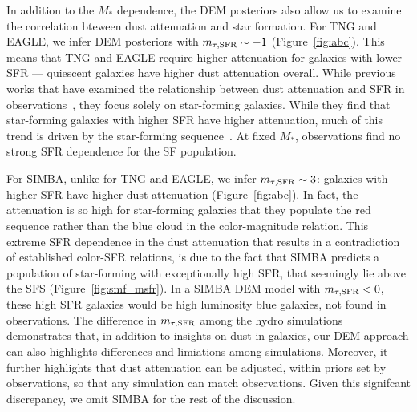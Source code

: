 In addition to the $M_*$ dependence, the DEM posteriors also allow us to
examine the correlation bteween dust attenuation and star formation. For TNG
and EAGLE, we infer DEM posteriors with $m_{\tau,{\rm SFR}}\sim-1$ (Figure~\ref{fig:abc}). 
This means that TNG and EAGLE require higher attenuation for galaxies with
lower SFR --- \ie quiescent galaxies have higher dust attenuation overall.
While previous works that have examined the relationship between dust attenuation
and SFR in observations~\citep[\eg][]{garn2010, reddy2015, battisti2016,
battisti2017}, they focus solely on star-forming galaxies. While they find that
star-forming galaxies with higher SFR have higher attenuation, much of this
trend is driven by the star-forming sequence~\citep[more massive star-forming
galaxies have higher SFR;][]{garn2010, battisti2017}. At fixed $M_*$,
observations find no strong SFR dependence for the SF population. 

For SIMBA, unlike for TNG and EAGLE, we infer $m_{\tau,{\rm SFR}}\sim 3$: galaxies with
higher SFR have higher dust attenuation (Figure~\ref{fig:abc}). In fact, the
attenuation is so high for star-forming galaxies that they populate the red
sequence rather than the blue cloud in the color-magnitude relation. This
extreme SFR dependence in the dust attenuation that results in a contradiction of
established color-SFR relations, is due to the fact that SIMBA predicts a population of
star-forming with exceptionally high SFR, that seemingly lie above the SFS
(Figure~\ref{fig:smf_msfr}). In a SIMBA DEM model with $m_{\tau,{\rm SFR}} < 0$, these high
SFR galaxies would be high luminosity blue galaxies, not found in observations. 
 The difference in $m_{\tau,{\rm SFR}}$ 
among the hydro simulations demonstrates that, in addition to insights on dust
in galaxies, our DEM approach can also highlights differences and limiations among 
simulations. Moreover, it further highlights that dust attenuation can be
adjusted, within priors set by observations, so that any simulation can 
match observations. Given this signifcant discrepancy, we omit SIMBA for the
rest of the discussion.



